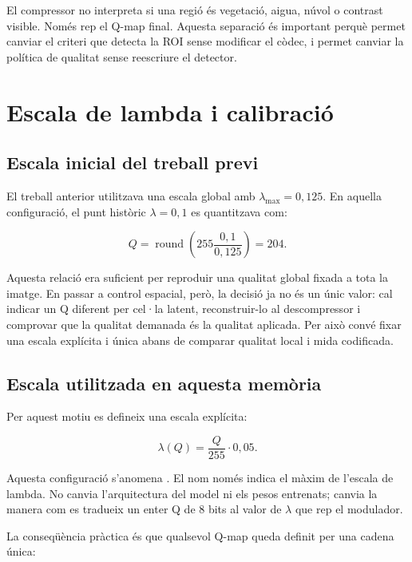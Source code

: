 El compressor no interpreta si una regió és vegetació, aigua, núvol o contrast
visible. Només rep el Q-map final. Aquesta separació és important perquè permet
canviar el criteri que detecta la ROI sense modificar el còdec, i permet canviar
la política de qualitat sense reescriure el detector.

\section{Escala de lambda i calibració}\label{sec:lambda005}

\subsection{Escala inicial del treball previ}

El treball anterior utilitzava una escala global amb $\lambda_{\max}=0,125$.
En aquella configuració, el punt històric $\lambda=0,1$ es quantitzava com:

\begin{equation}
Q=\operatorname{round}\left(255\frac{0,1}{0,125}\right)=204.
\end{equation}

Aquesta relació era suficient per reproduir una qualitat global fixada a tota
la imatge. En passar a control espacial, però, la decisió ja no és un únic valor:
cal indicar un Q diferent per cel·la latent, reconstruir-lo al descompressor i
comprovar que la qualitat demanada és la qualitat aplicada. Per això convé fixar
una escala explícita i única abans de comparar qualitat local i mida codificada.

\subsection{Escala utilitzada en aquesta memòria}

Per aquest motiu es defineix una escala explícita:

\begin{equation}
\lambda(Q)=\frac{Q}{255}\cdot0,05.
\label{eq:lambda005_control}
\end{equation}

Aquesta configuració s'anomena . El nom només indica el màxim
de l'escala de lambda. No canvia l'arquitectura del model ni els pesos
entrenats; canvia la manera com es tradueix un enter Q de 8 bits al valor de
$\lambda$ que rep el modulador.

La conseqüència pràctica és que qualsevol Q-map queda definit per una cadena
única:

